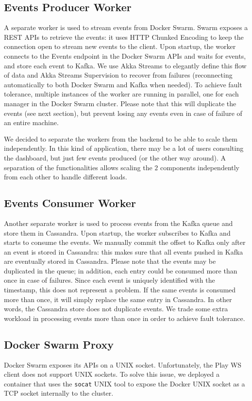 \subsection{Events Producer Worker}
A separate worker is used to stream events from Docker Swarm.
Swarm exposes a REST APIs to retrieve the events: it uses HTTP Chunked Encoding to keep the connection open to stream new events to the client.
Upon startup, the worker connects to the Events endpoint in the Docker Swarm APIs and waits for events, and store each event to Kafka.
We use Akka Streams to elegantly define this flow of data and Akka Streams Supervision to recover from failures (reconnecting automatically to both Docker Swarm and Kafka when needed).
To achieve fault tolerance, multiple instances of the worker are running in parallel, one for each manager in the Docker Swarm cluster.
Please note that this will duplicate the events (see next section), but prevent losing any events even in case of failure of an entire machine.

We decided to separate the workers from the backend to be able to scale them independently.
In this kind of application, there may be a lot of users consulting the dashboard, but just few events produced (or the other way around).
A separation of the functionalities allows scaling the $2$ components independently from each other to handle different loads.


\subsection{Events Consumer Worker}
Another separate worker is used to process events from the Kafka queue and store them in Cassandra.
Upon startup, the worker subscribes to Kafka and starts to consume the events.
We manually commit the offset to Kafka only after an event is stored in Cassandra:
this makes sure that all events pushed in Kafka are eventually stored in Cassandra.
Please note that the events may be duplicated in the queue;
in addition, each entry could be consumed more than once in case of failures.
Since each event is uniquely identified with the timestamp, this does not represent a problem.
If the same events is consumed more than once, it will simply replace the same entry in Cassandra.
In other words, the Cassandra store does not duplicate events.
We trade some extra workload in processing events more than once in order to achieve fault tolerance.


\subsection{Docker Swarm Proxy}
Docker Swarm exposes its APIs on a UNIX socket.
Unfortunately, the Play WS client does not support UNIX sockets.
To solve this issue, we deployed a container that uses the \texttt{socat} UNIX tool to expose the Docker UNIX socket as a TCP socket internally to the cluster.


